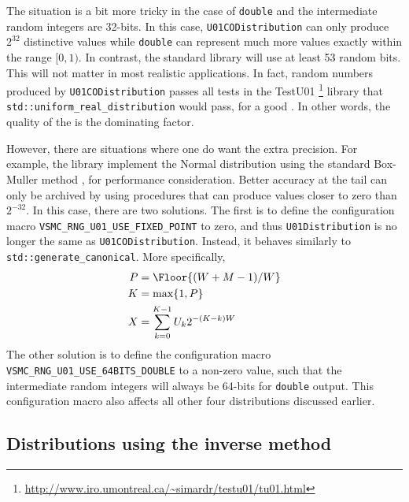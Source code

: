 The situation is a bit more tricky in the case of \verb|double| and the
intermediate random integers are 32-bits. In this case,
\verb|U01CODistribution| can only produce $2^{32}$ distinctive values while
\verb|double| can represent much more values exactly within the range $[0, 1)$.
In contrast, the standard library will use at least 53 random bits. This will
not matter in most realistic applications. In fact, random numbers produced by
\verb|U01CODistribution| passes all tests in the
{\lnfigures\tbfigures TestU01}%
\footnote{\url{http://www.iro.umontreal.ca/~simardr/testu01/tu01.html}}
library that \verb|std::uniform_real_distribution| would pass, for a good \rng.
In other words, the quality of the \rng is the dominating factor.

However, there are situations where one do want the extra precision. For
example, the library implement the Normal distribution using the standard
Box-Muller method \parencite{Box:1958hv}, for performance consideration. Better
accuracy at the tail can only be archived by using procedures that can produce
values closer to zero than $2^{-32}$. In this case, there are two solutions.
The first is to define the configuration macro
\verb|VSMC_RNG_U01_USE_FIXED_POINT| to zero, and thus \verb|U01Distribution| is
no longer the same as \verb|U01CODistribution|. Instead, it behaves similarly
to \verb|std::generate_canonical|. More specifically,
\begin{align*}
  P &= \Floor{(W + M - 1) / W} \\
  K &= \max\{1, P\} \\
  X &= \sum_{k=0}^{K - 1} U_k 2^{-(K - k)W}
\end{align*}
The other solution is to define the configuration macro
\verb|VSMC_RNG_U01_USE_64BITS_DOUBLE| to a non-zero value, such that the
intermediate random integers will always be 64-bits for \verb|double| output.
This configuration macro also affects all other four distributions discussed
earlier.

\subsection{Distributions using the inverse method}
\label{sub:Distributions using the inverse method}

